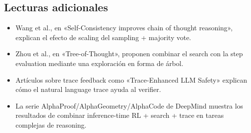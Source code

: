 \documentclass[a4paper]{article}
\begin{document}
\subsection{Lecturas adicionales}
\begin{itemize}
\item Wang et al., en «Self-Consistency improves chain of thought reasoning», explican el efecto de scaling del sampling + majority vote.
\item Zhou et al., en «Tree-of-Thought», proponen combinar el search con la step evaluation mediante una exploración en forma de árbol.
\item Artículos sobre trace feedback como «Trace-Enhanced LLM Safety» explican cómo el natural language trace ayuda al verifier.
\item La serie AlphaProof/AlphaGeometry/AlphaCode de DeepMind muestra los resultados de combinar inference-time RL + search + trace en tareas complejas de reasoning.
\end{itemize}
\end{document}
